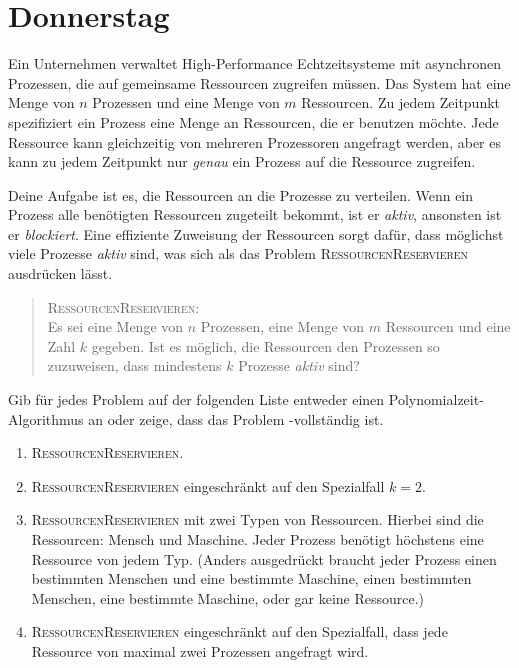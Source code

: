 \documentclass{uebung_cs}
\begin{document}
\clearpage
\section*{Donnerstag}

\begin{exercise}[Ressourcenmanagement][\atschool]
    Ein Unternehmen verwaltet High-Performance Echtzeitsysteme mit asynchronen Prozessen, die auf gemeinsame Ressourcen zugreifen müssen. Das System hat eine Menge von $n$ Prozessen und eine Menge von $m$ Ressourcen.
    Zu jedem Zeitpunkt spezifiziert ein Prozess eine Menge an Ressourcen, die er benutzen möchte. Jede Ressource kann gleichzeitig von mehreren Prozessoren angefragt werden, aber es kann zu jedem Zeitpunkt nur \emph{genau} ein Prozess auf die Ressource zugreifen.

    Deine Aufgabe ist es, die Ressourcen an die Prozesse zu verteilen. Wenn ein Prozess alle benötigten Ressourcen zugeteilt bekommt, ist er \textit{aktiv}, ansonsten ist er \textit{blockiert}. Eine effiziente Zuweisung der Ressourcen sorgt dafür, dass möglichst viele Prozesse \textit{aktiv} sind, was sich als das Problem \textsc{RessourcenReservieren} ausdrücken lässt.
    \begin{quote}
        \textsc{RessourcenReservieren}:\\
        Es sei eine Menge von $n$ Prozessen, eine Menge von $m$ Ressourcen und eine Zahl $k$ gegeben. Ist es möglich, die Ressourcen den Prozessen so zuzuweisen, dass mindestens $k$ Prozesse \textit{aktiv} sind?
    \end{quote}

    Gib für jedes Problem auf der folgenden Liste entweder einen Polynomialzeit-Algorithmus an oder zeige, dass das Problem \NP-vollständig ist.
    \begin{enumerate}
        \item \textsc{RessourcenReservieren}.
        \item \textsc{RessourcenReservieren} eingeschränkt auf den Spezialfall $k=2$.
        \item \textsc{RessourcenReservieren} mit zwei Typen von Ressourcen. Hierbei sind die Ressourcen: Mensch und Maschine. Jeder Prozess benötigt höchstens eine Ressource von jedem Typ. (Anders ausgedrückt braucht jeder Prozess einen bestimmten Menschen und eine bestimmte Maschine, einen bestimmten Menschen, eine bestimmte Maschine, oder gar keine Ressource.)
        \item \textsc{RessourcenReservieren} eingeschränkt auf den Spezialfall, dass jede Ressource von maximal zwei Prozessen angefragt wird.
    \end{enumerate}
\end{exercise}
\end{document}
